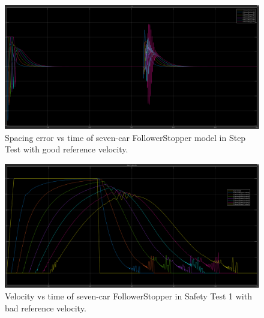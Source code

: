 \documentclass[conference]{IEEEtran}
\begin{document}
\begin{appendix}
\begin{figure}[htbp]
\centerline{\includegraphics[width=6.50 in]{multiFS_errorgood.PNG}}
\caption{Spacing error vs time of seven-car FollowerStopper model in Step Test with good reference velocity.}
\label{stringerrorgood}
\end{figure}

\begin{figure}[htbp]
\centerline{\includegraphics[width=6.50 in]{multiFS_safety1.PNG}}
\caption{Velocity vs time of seven-car FollowerStopper in Safety Test 1 with bad reference velocity.}
\label{stringsafety1}
\end{figure}

\end{appendix}
\end{document}
